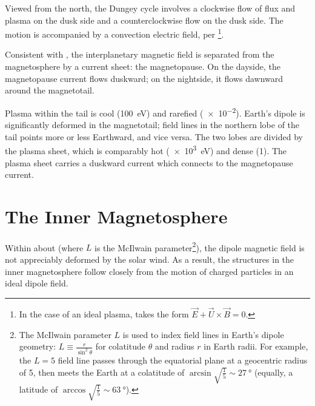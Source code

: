 Viewed from the north, the Dungey cycle involves a clockwise flow of flux and plasma on the dusk side and a counterclockwise flow on the dusk side. The motion is accompanied by a convection electric field, per \ohmlaw\footnote{In the case of an ideal plasma, \ohmlaw takes the form $\vec{E} + \vec{U} \times \vec{B} = 0$. }. 


Consistent with \amplaw, the interplanetary magnetic field is separated from the magnetosphere by a current sheet: the magnetopause. On the dayside, the magnetopause current flows duskward; on the nightside, it flows dawnward around the magnetotail. 

Plasma within the tail is cool (\about\SI{100}{\eV}) and rarefied (\about\SI{e-2}{\percc}). Earth's dipole is significantly deformed in the magnetotail; field lines in the northern lobe of the tail points more or less Earthward, and vice versa. The two lobes are divided by the plasma sheet, which is comparably hot (\about\SI{e3}{\eV}) and dense (\about\SI{1}{\percc}). The plasma sheet carries a duskward current which connects to the magnetopause current. 

\section{The Inner Magnetosphere}

Within about  (where $L$ is the McIlwain parameter\footnote{The McIlwain parameter $L$ is used to index field lines in Earth's dipole geometry: $L \equiv \frac{r}{\sin^2\theta}$ for colatitude $\theta$ and radius $r$ in Earth radii. For example, the $L=5$ field line passes through the equatorial plane at a geocentric radius of \SI{5}{\RE}, then meets the Earth at a colatitude of $\arcsin \sqrt{ \frac{1}{5} } \sim \SI{27}{\degree}$ (equally, a latitude of $\arccos \sqrt{ \frac{1}{5} } \sim \SI{63}{\degree}$). }), the dipole magnetic field is not appreciably deformed by the solar wind. As a result, the structures in the inner magnetosphere follow closely from the motion of charged particles in an ideal dipole field. 

